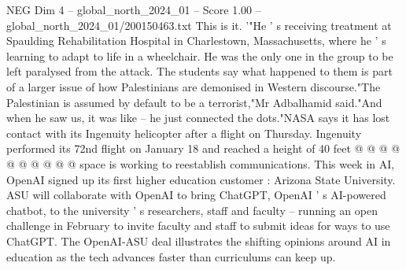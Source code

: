 \begin{textsample}{NEG Dim 4 – global\_north\_2024\_01 – Score 1.00 – global\_north\_2024\_01/200150463.txt}
This is it. '"He ' s receiving treatment at Spaulding Rehabilitation Hospital in Charlestown, Massachusetts, where he ' s learning to adapt to life in a wheelchair.
He was the only one in the group to be left paralysed from the attack.
The students say what happened to them is part of a larger issue of how Palestinians are demonised in Western discourse."The Palestinian is assumed by default to be a terrorist,"Mr Adbalhamid said."And when he saw us, it was like -- he just connected the dots."NASA says it has lost contact with its Ingenuity helicopter after a flight on Thursday.
Ingenuity performed its 72nd flight on January 18 and reached a height of 40 feet @ @ @ @ @ @ @ @ @ @ space is working to reestablish communications.
This week in AI, OpenAI signed up its first higher education customer : Arizona State University.
ASU will collaborate with OpenAI to bring ChatGPT, OpenAI ' s AI-powered chatbot, to the university ' s researchers, staff and faculty -- running an open challenge in February to invite faculty and staff to submit ideas for ways to use ChatGPT.
The OpenAI-ASU deal illustrates the shifting opinions around AI in education as the tech advances faster than curriculums can keep up.

\end{textsample}
